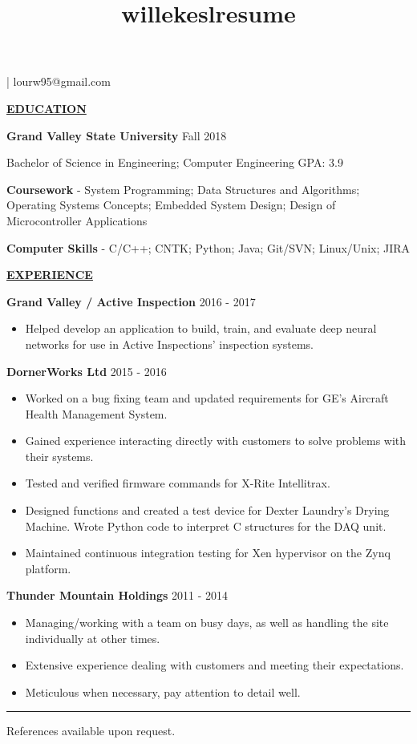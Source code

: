\documentclass[12pt]{article}
\title{willekeslresume}
\newlength{\remaining}
\newcommand{\titleline}[1]{
\setlength{\remaining}{\textwidth-\widthof{\textsc{#1}}}
\noindent\underline{\textsc{#1}\hspace*{\remaining}}\par}
\begin{document}
{
	 | lourw95@gmail.com

	\vspace{\baselineskip}
	\titleline{\textbf{EDUCATION}}
    \noindent\textbf{Grand Valley State University} \hfill Fall 2018
    
    \noindent Bachelor of Science in Engineering; Computer Engineering \hfill GPA: 3.9
    
    \vspace{\baselineskip}
    \noindent\textbf{Coursework} - System Programming; Data Structures and Algorithms; Operating Systems Concepts; Embedded System Design; Design of Microcontroller Applications
    
    \noindent\textbf{Computer Skills} - C/C++; CNTK; Python; Java; Git/SVN; Linux/Unix; JIRA
    
    \vspace{\baselineskip}
    \titleline{\textbf{EXPERIENCE}}
    \noindent\textbf{Grand Valley / Active Inspection} \hfill 2016 - 2017
    \begin{itemize}[noitemsep]
    	\item Helped develop an application to build, train, and evaluate deep neural networks for use in Active Inspections' inspection systems.
    \end{itemize}
    
    \noindent\textbf{DornerWorks Ltd} \hfill 2015 - 2016
    \begin{itemize}[noitemsep]
    	\item Worked on a bug fixing team and updated requirements for GE's Aircraft Health Management System.
    	\item Gained experience interacting directly with customers to solve problems with their systems.
    	\item Tested and verified firmware commands for X-Rite Intellitrax.
    	\item Designed functions and created a test device for Dexter Laundry's Drying Machine. Wrote Python code to interpret C structures for the DAQ unit.
    	\item Maintained continuous integration testing for Xen hypervisor on the Zynq platform.
    \end{itemize}
    
    \noindent\textbf{Thunder Mountain Holdings} \hfill 2011 - 2014
    \begin{itemize}[noitemsep]
    	\item Managing/working with a team on busy days, as well as handling the site individually at other times.
    	\item Extensive experience dealing with customers and meeting their expectations.
    	\item Meticulous when necessary, pay attention to detail well.
    \end{itemize}

    \bigskip
    \hrule
	\bigskip
    \noindent References available upon request.
      
}

{\noindent}
\end{document}

